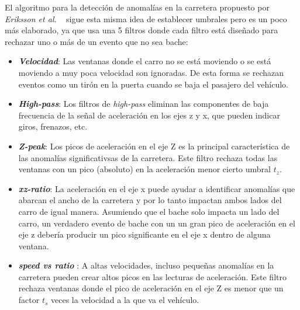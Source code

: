 

		El algoritmo para la detección de anomalías en la carretera propuesto por \emph{Eriksson et al.} ~ sigue
		esta misma idea de establecer umbrales pero es un poco más elaborado, ya que usa una 5 filtros donde cada filtro está diseñado
		para rechazar uno o más de un evento que no sea bache:\\

		\begin{itemize}
			\item \emph{\textbf {Velocidad}}: Las ventanas donde el carro no se está moviendo o se está moviendo a muy poca velocidad son ignoradas. 
				De esta forma se rechazan eventos como un tirón en la puerta cuando se baja el pasajero del vehículo.\\
			\item \emph{\textbf {High-pass}}: Los filtros de \emph{high-pass} eliminan las componentes de baja frecuencia de la señal de aceleración
				en los ejes z y x, que pueden indicar giros, frenazos, etc.\\
			\item  \emph{\textbf {Z-peak}}: Los picos de aceleración en el eje Z es la principal característica de las anomalías significativsas de
				la carretera. Este filtro rechaza todas las ventanas con un pico (absoluto) en la aceleración menor cierto umbral $t_z$.\\
			\item \emph{\textbf {xz-ratio}}: La aceleración en el eje x puede ayudar a identificar anomalías que abarcan el ancho de la carretera
				y por lo tanto impactan ambos lados del carro de igual manera.  Asumiendo que el bache solo impacta un lado del carro, un verdadero
				evento de bache con un un gran pico de aceleración en el eje z debería producir un pico significante en el eje x dentro de alguna
				ventana.\\
			\item \emph{\textbf {speed vs ratio }}:	A altas velocidades, incluso pequeñas anomalías en la carretera pueden crear altos picos en las
				lecturas de aceleración. Este filtro rechaza ventanas donde el pico de aceleración en el eje Z es menor que un factor $t_s$ veces la
				velocidad a la que va el vehículo.
		\end{itemize}

